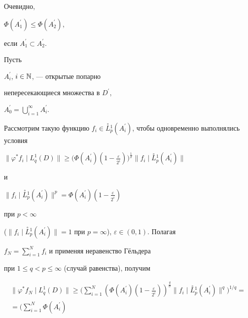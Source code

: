 \begin{pf}


Очевидно, 


$\Phi(A_1^{\prime})\leq\Phi(A_2^{\prime})$,


если $A_1^{\prime}\subset A_2^{\prime}$.





Пусть


$A_{i}^{\prime}$, $i\in {\Bbb N}$, --- открытые попарно


непересекающиеся множества в $D^{\prime}$,


$A^{\prime}_0=\bigcup\limits_{i=1}^{\infty}A_i^{\prime}$.


Рассмотрим такую функцию $f_i\in\overset{\circ}{L}{}_{p}^{1}


(A_i^{\prime})$, чтобы одновременно выполнялись условия


$\|\varphi^{\ast} f_i\mid{L}_{q}^{1} (D)\|\geq


\big(\Phi(A_i^{\prime})(1-\frac{\varepsilon}{2^i})\big)^{\frac{1}{\sigma}}


\|f_i\mid\overset{\circ}{L}{}_{p}^{1}(A_i^{\prime})\|$


и


$\|f_i\mid\overset{\circ}{L}{}_{p}^{1}(A_i^{\prime})


\|^p=\Phi(A_i^{\prime})(1-\frac{\varepsilon}{2^i})$


при $p<\infty$


($\|f_i\mid\overset{\circ}{L}{}_{p}^{1}(A_i^{\prime})


\|=1$ при $p=\infty$), $\varepsilon\in(0,1)$. Полагая


$f_N=\sum\limits_{i=1}^{N}f_i$ и применяя неравенство Г\"ельдера


при $1\leq q<p\leq\infty$ (случай равенства), получим


\begin{multline*}


\|\varphi^{\ast} f_N\mid{L}_{q}^{1} (D)\|\geq


\bigg(\sum_{i=1}^{N}


\left(\Phi(A_i^{\prime})\left(1-\frac{\varepsilon}{2^i}


\right)\right)^{\frac{q}{\sigma}}


\|f_i\mid\overset{\circ}{L}{}_{p}^{1}(A_i^{\prime})


\|^q\bigg)^{1/q}= \\


=\bigg(\sum_{i=1}^{N}\Phi(A_i^{\prime})



\end{multline*}
\end{pf}
